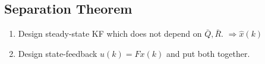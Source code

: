 \documentclass[landscape,a4paper,8pt]{scrartcl}
\begin{document}
\begin{multicols*}{3}


\subsection{Separation Theorem}

\begin{enumerate}
\item Design steady-state KF which does not depend on $\bar{Q}, \bar{R}$. $\Rightarrow \hat{x}(k)$
\item Design state-feedback $u(k) = F x(k)$ and put both together.
\end{enumerate}

\end{multicols*}
\end{document}
